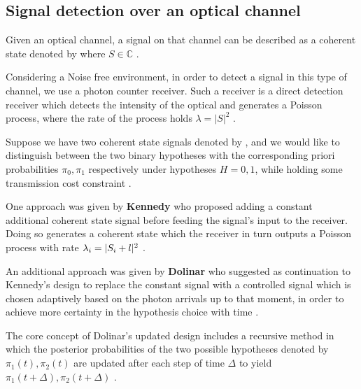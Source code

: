 \documentclass[12pt]{article}
\newcommand{\lambdaWave}{\overline{\lambda}}
\newcommand{\lambdaSwitch}[1]{%
		\IfEqCase{#1}{%
			{0}{\lambda_0=|S_0+l|^2}%
			{1}{\lambda_1=|S_1+l|^2}%
			{i}{\lambda_i=|S_i+l|^2}%
			{~}{\widetilde{\lambda}=\pi_{0}\sqrt{\lambda_{0}}+\pi_{1}\sqrt{\lambda_{1}}}%
			{-}{\lambdaWave=\pi_{0}\lambda_{0}+\pi_{1}\lambda_{1}}%
		}[\PackageError{tree}{Undefined option to tree: #1}{}]%
	}%
\begin{document}
	\begin{center}
		\section*{Signal detection over an optical channel}
	\end{center}

	\vspace{0.3cm}

	Given an optical channel, a signal on that channel can be described as a coherent state denoted by  where  $S\in\mathbb{C}$
.\\\par
	Considering a Noise free environment, in order to detect a signal in this type of channel, 
	we use a photon counter receiver. Such a receiver is a direct detection receiver which detects 
	the intensity of the optical and generates a Poisson process, where the rate of the process holds $\lambda = |S|^2$ 
.\\\par
	Suppose we have two coherent state signals denoted by ,  and we would like to distinguish between the two 
	binary hypotheses with the corresponding priori probabilities $\pi_0, \pi_1$ respectively under hypotheses $H=0,1$, 
	while holding some transmission cost constraint
.\\\par
	One approach was given by \textbf{Kennedy} who proposed adding a constant additional coherent state signal 
	before feeding the signal’s input to the receiver. Doing so generates a coherent state  which 
	the receiver in turn outputs a Poisson process with rate $\lambdaSwitch{i}$
.\\\par
	An additional approach was given by \textbf{Dolinar} who suggested as continuation to Kennedy’s design to replace the constant 
	signal with a controlled signal  which is chosen adaptively based on the photon arrivals up to that moment, 
	in order to achieve more certainty in the hypothesis choice with time
.\\\par
	The core concept of Dolinar’s updated design includes a recursive method in which the posterior probabilities of 
	the two possible hypotheses denoted by $\pi_1(t), \pi_2(t)$ are updated after each step of time $\Delta$ to yield 
	$\pi_1(t+\Delta), \pi_2(t+\Delta)$
.\\\par
\end{document}
